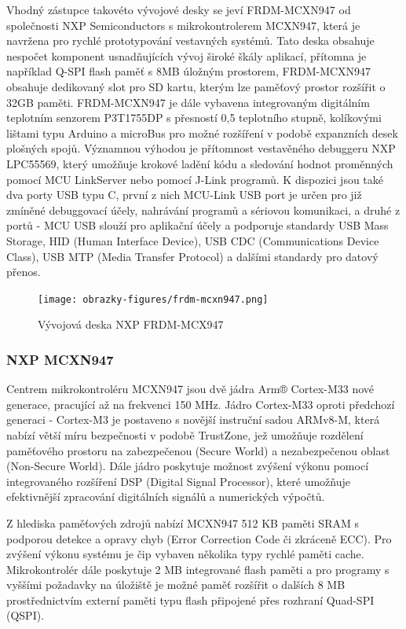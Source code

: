 Vhodný zástupce takovéto vývojové desky se jeví FRDM-MCXN947 od společnosti NXP Semiconductors s mikrokontrolerem MCXN947, která je navržena pro rychlé prototypování vestavných systémů. Tato deska obsahuje nespočet komponent usnadňujících vývoj široké škály aplikací, přítomna je například Q-SPI flash paměť s 8MB úložným prostorem, FRDM-MCXN947 obsahuje dedikovaný slot pro SD kartu, kterým lze paměťový prostor rozšířit o 32GB paměti. FRDM-MCXN947 je dále vybavena integrovaným digitálním teplotním senzorem P3T1755DP s přesností 0,5 teplotního stupně, kolíkovými lištami typu Arduino a microBus pro možné rozšíření v podobě expanzních desek plošných spojů. Významnou výhodou je přítomnost vestavěného debuggeru NXP LPC55569, který umožňuje krokové ladění kódu a sledování hodnot proměnných pomocí MCU LinkServer nebo pomocí J-Link programů. K dispozici jsou také dva porty USB typu C, první z nich MCU-Link USB port je určen pro již zmíněné debuggovací účely, nahrávání programů a sériovou komunikaci, a druhé z portů - MCU USB slouží pro aplikační účely a podporuje standardy USB Mass Storage, HID (Human Interface Device), USB CDC (Communications Device Class), USB MTP (Media Transfer Protocol) a dalšími standardy pro datový přenos. \cite{nxp_MCX_Nx4x_Reference_Manual, nxp_FRDM_MCXN947_getting_started}

\begin{figure}[h]
    \centering
    \texttt{[image: obrazky-figures/frdm-mcxn947.png]}
    
    \caption{Vývojová deska NXP FRDM-MCX947 \cite{nxp_FRDM_MCXN947_getting_started}}
    \label{fig:frdm-mcxn947}
\end{figure}

\subsubsection{NXP MCXN947}
Centrem mikrokontroléru MCXN947 jsou dvě jádra Arm® Cortex-M33 nové generace, pracující až na frekvenci 150 MHz. Jádro Cortex-M33 oproti předchozí generaci - Cortex-M3 je postaveno s novější instruční sadou ARMv8-M, která nabízí větší míru bezpečnosti v podobě TrustZone, jež umožňuje rozdělení paměťového prostoru na zabezpečenou (Secure World) a nezabezpečenou oblast (Non-Secure World). Dále jádro poskytuje možnost zvýšení výkonu pomocí integrovaného rozšíření DSP (Digital Signal Processor), které umožňuje efektivnější zpracování digitálních signálů a numerických výpočtů. \cite{nxp_MCX_Nx4x_Reference_Manual}

Z hlediska paměťových zdrojů nabízí MCXN947 512 KB paměti SRAM s podporou detekce a opravy chyb (Error Correction Code či zkráceně ECC). Pro zvýšení výkonu systému je čip vybaven několika typy rychlé paměti cache. Mikrokontrolér dále poskytuje 2 MB integrované flash paměti a pro programy s vyššími požadavky na úložiště je možné paměť rozšířit o dalších 8 MB prostřednictvím externí paměti typu flash připojené přes rozhraní Quad-SPI (QSPI). \cite{nxp_MCX_Nx4x_Reference_Manual}

